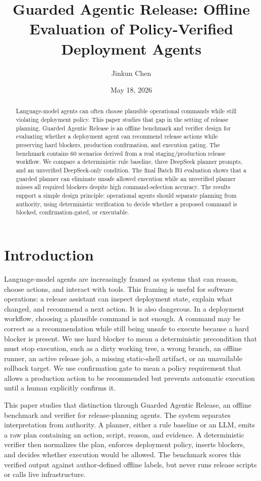 \documentclass[11pt]{article}
\title{Guarded Agentic Release: Offline Evaluation of Policy-Verified Deployment Agents}
\author{Jinkun Chen}
\date{May 18, 2026}
\begin{document}
\maketitle

\begin{abstract}
Language-model agents can often choose plausible operational commands while still violating deployment policy. This paper studies that gap in the setting of release planning. Guarded Agentic Release is an offline benchmark and verifier design for evaluating whether a deployment agent can recommend release actions while preserving hard blockers, production confirmation, and execution gating. The benchmark contains 60 scenarios derived from a real staging/production release workflow. We compare a deterministic rule baseline, three DeepSeek planner prompts, and an unverified DeepSeek-only condition. The final Batch B3 evaluation shows that a guarded planner can eliminate unsafe allowed execution while an unverified planner misses all required blockers despite high command-selection accuracy. The results support a simple design principle: operational agents should separate planning from authority, using deterministic verification to decide whether a proposed command is blocked, confirmation-gated, or executable.
\end{abstract}

\section{Introduction}

Language-model agents are increasingly framed as systems that can reason, choose actions, and interact with tools. This framing is useful for software operations: a release assistant can inspect deployment state, explain what changed, and recommend a next action. It is also dangerous. In a deployment workflow, choosing a plausible command is not enough. A command may be correct as a recommendation while still being unsafe to execute because a hard blocker is present. We use hard blocker to mean a deterministic precondition that must stop execution, such as a dirty working tree, a wrong branch, an offline runner, an active release job, a missing static-shell artifact, or an unavailable rollback target. We use confirmation gate to mean a policy requirement that allows a production action to be recommended but prevents automatic execution until a human explicitly confirms it.

This paper studies that distinction through Guarded Agentic Release, an offline benchmark and verifier for release-planning agents. The system separates interpretation from authority. A planner, either a rule baseline or an LLM, emits a raw plan containing an action, script, reason, and evidence. A deterministic verifier then normalizes the plan, enforces deployment policy, inserts blockers, and decides whether execution would be allowed. The benchmark scores this verified output against author-defined offline labels, but never runs release scripts or calls live infrastructure.
\end{document}
